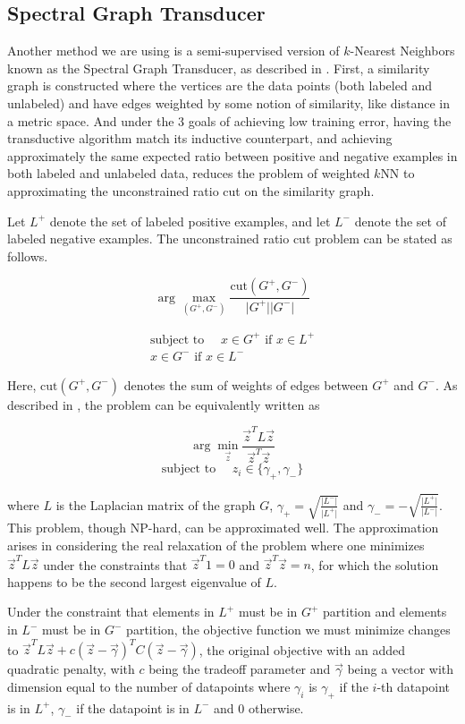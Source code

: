\documentclass[11pt]{article}
\begin{document}
\subsection{Spectral Graph Transducer}
Another method we are using is a semi-supervised version of $k$-Nearest Neighbors known as the Spectral Graph Transducer, as described in \cite{joachims2003transductive}. First, a similarity
graph is constructed where the vertices are the data points (both labeled
and unlabeled) and have edges weighted by some notion of similarity, like
distance in a metric space.
And under the 3 goals of achieving low training error, having the 
transductive algorithm match its inductive counterpart, and achieving
approximately the same expected ratio between positive and negative examples 
in both labeled and unlabeled data, \cite{joachims2003transductive}
reduces the problem of weighted $k$NN to approximating the unconstrained
ratio cut on the similarity graph.

Let $L^+$ denote the set of labeled positive examples, and let
$L^-$ denote the set of labeled negative examples.
The unconstrained ratio cut problem can be stated as follows.

\[\arg\max_{(G^+, G^-)}\frac{\mathrm{cut}(G^+,
G^-)}{\lvert G^+\rvert\lvert G^-\rvert}\]

\begin{align*}
\text{subject to }\quad x\in G^+\text{ if }x\in L^+\\
x\in G^-\text{ if }x\in L^-
\end{align*}

Here, $\mathrm{cut}(G^+, G^-)$ denotes the sum of weights of
edges between $G^+$ and $G^-$. As described in \cite{dhillon2001co}, the problem can be equivalently written as

\[\arg\min_{\vec{z}}\frac{\vec{z}^T L\vec{z}}{\vec{z}^T\vec{z}}\]
\[\text{subject to }\quad z_i\in\{\gamma_+,\gamma_-\}\]

where $L$ is the Laplacian matrix of the graph $G$,
$\gamma_+=\sqrt{\frac{\lvert L^-\rvert}{\lvert L^+\rvert}}$
and $\gamma_-=-\sqrt{\frac{\lvert L^+\rvert}{\lvert L^-\rvert}}$.
This problem, though NP-hard, can
be approximated well. The approximation arises in considering the real relaxation of the problem where one minimizes $\vec{z}^TL\vec{z}$
under the constraints that $\vec{z}^T1=0$ and $\vec{z}^T\vec{z}=n$,
for which the solution happens to be the second largest eigenvalue of
$L$.

Under the constraint that elements in $L^+$ must be in $G^+$
partition and elements in $L^-$ must be in $G^-$ partition,
the objective function we must minimize changes to
$\vec{z}^TL\vec{z}+c(\vec{z}-\vec{\gamma})^TC(\vec{z}-\vec{\gamma})$,
the original objective with an added quadratic penalty, with $c$
being the tradeoff parameter and $\vec{\gamma}$ being a vector
with dimension equal to the number of datapoints where $\gamma_i$
is $\gamma_+$ if the $i$-th datapoint is in $L^+$, $\gamma_-$
if the datapoint is in $L^-$ and 0 otherwise.
\end{document}
